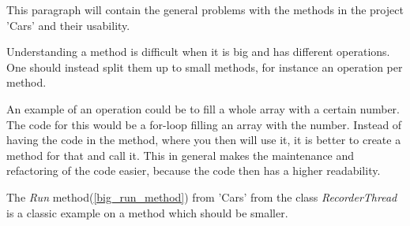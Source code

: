 This paragraph will contain the general problems with the methods in the project 'Cars' and their usability.

Understanding a method is difficult when it is big and has different operations.
One should instead split them up to small methods, for instance an operation per method.

An example of an operation could be to fill a whole array with a certain number.
The code for this would be a for-loop filling an array with the number.
Instead of having the code in the method, where you then will use it, it is better to create a method for that and call it.
This in general makes the maintenance and refactoring of the code easier, because the code then has a higher readability.

The \textit{Run} method(\cref{big_run_method}) from 'Cars' from the class \textit{RecorderThread} is a classic example on a method which should be smaller.